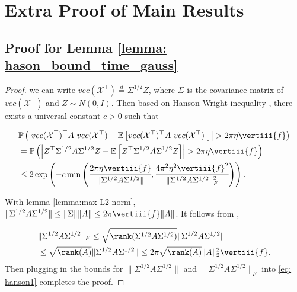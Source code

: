\section{Extra Proof of Main Results}

\subsection{Proof for Lemma \ref{lemma: hason_bound_time_gauss}}
\begin{proof}
we can write $vec(\mathcal{\mathcal{X}}^\top)\stackrel{d}{=}\Sigma^{1/2}Z$, where $\Sigma$ is the covariance matrix of $vec(\mathcal{\mathcal{X}}^\top)$ and $Z\sim N(0,I)$. Then based on Hanson-Wright inequality \citep{rudelson2013hanson}, there exists a universal constant $c>0$ such that 

\begin{equation}
\label{eq: hanson1}
\begin{aligned}
&\mathbb{P}\left(\left|vec(\mathcal{\mathcal{X}}^\top)^\top A ~vec(\mathcal{\mathcal{X}}^\top) - \mathbb{E} \left[vec(\mathcal{\mathcal{X}}^\top)^\top A~ vec(\mathcal{\mathcal{X}}^\top)~\right]\right| >2\pi\eta\vertiii{f}\right) \\
&= \mathbb{P}\left(\left|Z^\top \Sigma^{1/2}A\Sigma^{1/2}Z - \mathbb{E}\left[ Z^\top \Sigma^{1/2}A\Sigma^{1/2}Z \right]\right|>2\pi \eta\vertiii{f}\right)\\
&\le 2\exp\left(-c\min\left(\cfrac{2\pi \eta\vertiii{f}}{\|\Sigma^{1/2}A\Sigma^{1/2}\|},\cfrac{4\pi^2\eta^2\vertiii{f}^2}{\|\Sigma^{1/2}A\Sigma^{1/2}\|_F^2}\right)\right).
\end{aligned}
\end{equation}




With lemma \ref{lemma:max-L2-norm}, $\|\Sigma^{1/2}A\Sigma^{1/2}\|\le \|\Sigma\|\|A\|\le 2\pi \vertiii{f} \|A\|$. It follows from \citet{golub2012matrix},


\begin{equation}
\begin{aligned}
&\|\Sigma^{1/2}A\Sigma^{1/2}\|_F \le \sqrt{\rank(\Sigma^{1/2}A\Sigma^{1/2})} \|\Sigma^{1/2}A\Sigma^{1/2}\|\\
&\le \sqrt{\rank(A)} \|\Sigma^{1/2}A\Sigma^{1/2}\| \le 2\pi \sqrt{\rank(A)} \|A\|_2^2 \vertiii{f}.
\end{aligned}
\end{equation}
Then plugging in the bounds for $\|\Sigma^{1/2}A\Sigma^{1/2}\|$ and 
$\|\Sigma^{1/2}A\Sigma^{1/2}\|_F$ into \eqref{eq: hanson1} completes the proof.
\end{proof}


